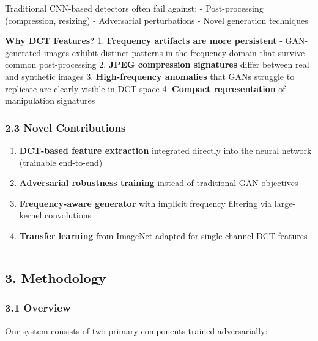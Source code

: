Traditional CNN-based detectors often fail against: - Post-processing
(compression, resizing) - Adversarial perturbations - Novel generation
techniques

\textbf{Why DCT Features?} 1. \textbf{Frequency artifacts are more
persistent} - GAN-generated images exhibit distinct patterns in the
frequency domain that survive common post-processing 2. \textbf{JPEG
compression signatures} differ between real and synthetic images 3.
\textbf{High-frequency anomalies} that GANs struggle to replicate are
clearly visible in DCT space 4. \textbf{Compact representation} of
manipulation signatures

\subsubsection{2.3 Novel Contributions}\label{novel-contributions}

\begin{enumerate}
\def\labelenumi{\arabic{enumi}.}
\tightlist
\item
  \textbf{DCT-based feature extraction} integrated directly into the
  neural network (trainable end-to-end)
\item
  \textbf{Adversarial robustness training} instead of traditional GAN
  objectives
\item
  \textbf{Frequency-aware generator} with implicit frequency filtering
  via large-kernel convolutions
\item
  \textbf{Transfer learning} from ImageNet adapted for single-channel
  DCT features
\end{enumerate}

\begin{center}\rule{0.5\linewidth}{0.5pt}\end{center}

\subsection{3. Methodology}\label{methodology}

\subsubsection{3.1 Overview}\label{overview}

Our system consists of two primary components trained adversarially:

